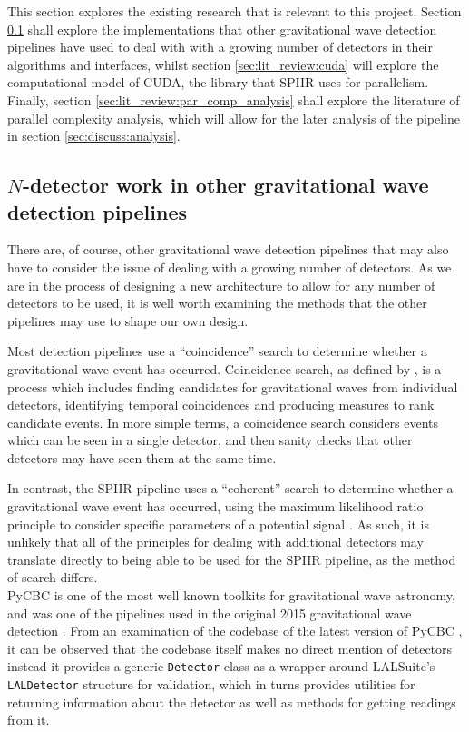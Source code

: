 \documentclass{article}
\begin{document}
This section explores the existing research that is relevant to this project.
Section \ref{sec:lit_review:pipelines} shall explore the implementations that other gravitational wave detection pipelines have used to deal with with a growing number of detectors in their algorithms and interfaces, whilst section \ref{sec:lit_review:cuda} will explore the computational model of CUDA, the library that SPIIR uses for parallelism.
Finally, section \ref{sec:lit_review:par_comp_analysis} shall explore the literature of parallel complexity analysis, which will allow for the later analysis of the pipeline in section \ref{sec:discuss:analysis}.

\subsection{\(N\)-detector work in other gravitational wave detection pipelines} \label{sec:lit_review:pipelines}

There are, of course, other gravitational wave detection pipelines that may also have to consider the issue of dealing with a growing number of detectors.
As we are in the process of designing a new architecture to allow for any number of detectors to be used, it is well worth examining the methods that the other pipelines may use to shape our own design.

Most detection pipelines use a ``coincidence'' search to determine whether a gravitational wave event has occurred.
Coincidence search, as defined by \cite[chapter 3]{ChuThesis}, is a process which includes finding candidates for gravitational waves from individual detectors, identifying temporal coincidences and producing measures to rank candidate events.
In more simple terms, a coincidence search considers events which can be seen in a single detector, and then sanity checks that other detectors may have seen them at the same time.

In contrast, the SPIIR pipeline uses a ``coherent'' search to determine whether a gravitational wave event has occurred, using the maximum likelihood ratio principle to consider specific parameters of a potential signal \cite[chapter 4]{ChuThesis}.
As such, it is unlikely that all of the principles for dealing with additional detectors may translate directly to being able to be used for the SPIIR pipeline, as the method of search differs.
\\

PyCBC is one of the most well known toolkits for gravitational wave astronomy, and was one of the pipelines used in the original 2015 gravitational wave detection \cite{pycbc_home}.
From an examination of the codebase of the latest version of PyCBC \cite[October 2020]{pycbc}, it can be observed that the codebase itself makes no direct mention of detectors \textemdash{} instead it provides a generic \texttt{Detector} class as a wrapper around LALSuite's \cite{lalsuite} \texttt{LALDetector} structure for validation, which in turns provides utilities for returning information about the detector as well as methods for getting readings from it.
\end{document}
